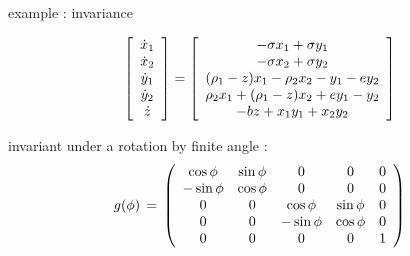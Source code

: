 \begin{frame}{example :  invariance}
			\begin{exampleblock}{{\cLe}}
\scriptsize		
\[
		\left[
					\begin{array}{c}
				\dot{x}_1 \\ \dot{x}_2 \\ \dot{y}_1 \\ \dot{y}_2 \\ \dot{z}
				\end{array}
		\right]
=
		\left[
					\begin{array}{c}
				 -\sigma x_1 + \sigma y_1 \\
				-\sigma x_2 + \sigma y_2 \\
                (\RerCLor-z) x_1 - \ImrCLor x_2 -y_1-e y_2 \\
                \ImrCLor x_1 + (\RerCLor-z) x_2 + e y_1- y_2 \\
				-b z + x_1 y_1 + x_2 y_2
				\end{array}
		\right]
\]
			\end{exampleblock}

\begin{block}{}
invariant under a  rotation by finite angle
\gSpace:
\scriptsize		
\[
\LieEl(\gSpace) \,=\,  \left(\barr{ccccc}
  \cos \gSpace  & \sin \gSpace  & 0 & 0 & 0 \\
 -\sin \gSpace  & \cos \gSpace  & 0 & 0 & 0 \\
 0 & 0 &  \cos \gSpace & \sin \gSpace   & 0 \\
 0 & 0 & -\sin \gSpace & \cos \gSpace   & 0 \\
 0 & 0 & 0             & 0              & 1
    \earr\right)
\] %
\end{block}
\end{frame}

